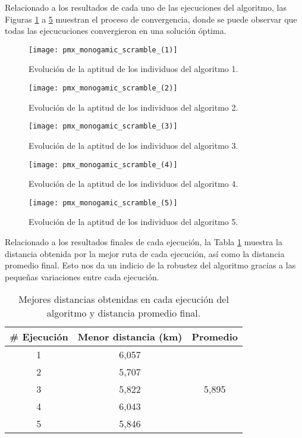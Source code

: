 Relacionado a los resultados de cada uno de las ejecuciones del algoritmo, las Figuras \ref{fig:AG_1} a \ref{fig:AG_5} muestran el proceso de convergencia, donde se puede observar que todas las ejecucuciones convergieron en una solución óptima.

\begin{figure}[htbp]
	\centering
	\texttt{[image: pmx\_monogamic\_scramble\_(1)]}
	\caption{Evolución de la aptitud de los individuos del algoritmo 1.}
	\label{fig:AG_1}
\end{figure}

\begin{figure}[htbp]
	\centering
	\texttt{[image: pmx\_monogamic\_scramble\_(2)]}
	\caption{Evolución de la aptitud de los individuos del algoritmo 2.}
	\label{fig:AG_2}
\end{figure}

\begin{figure}[htbp]
	\centering
	\texttt{[image: pmx\_monogamic\_scramble\_(3)]}
	\caption{Evolución de la aptitud de los individuos del algoritmo 3.}
	\label{fig:AG_3}
\end{figure}

\begin{figure}[htbp]
	\centering
	\texttt{[image: pmx\_monogamic\_scramble\_(4)]}
	\caption{Evolución de la aptitud de los individuos del algoritmo 4.}
	\label{fig:AG_4}
\end{figure}

\begin{figure}[htbp]
	\centering
	\texttt{[image: pmx\_monogamic\_scramble\_(5)]}
	\caption{Evolución de la aptitud de los individuos del algoritmo 5.}
	\label{fig:AG_5}
\end{figure}

\FloatBarrier
Relacionado a los resultados finales de cada ejecución, la Tabla \ref{tab:resultados} muestra la distancia obtenida por la mejor ruta de cada ejecución, así como la distancia promedio final. Esto nos da un indicio de la robustez del algoritmo gracias a las pequeñas variaciones entre cada ejecución.

\begin{table}[htbp]
\centering
\caption{Mejores distancias obtenidas en cada ejecución del algoritmo y distancia promedio final.}
\begin{tabular}{ccc}
\hline
\# Ejecución & Menor distancia (km) & Promedio               \\ \hline \hline
1            & 6,057           & \multirow{5}{*}{5,895} \\
2            & 5,707           &                        \\
3            & 5,822           &                        \\
4            & 6,043           &                        \\
5            & 5,846           &                        \\ \hline
\end{tabular}
\label{tab:resultados}
\end{table}